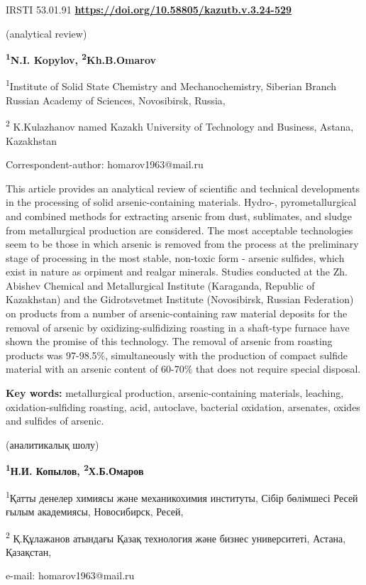 \newpage
IRSTI 53.01.91
\hfill {\bfseries \href{https://doi.org/10.58805/kazutb.v.3.24-529}{https://doi.org/10.58805/kazutb.v.3.24-529}}


\begin{center}
(analytical review)

{\bfseries \textsuperscript{1}N.I. Kopylov,
\textsuperscript{2}Kh.B.Omarov\envelope}

\textsuperscript{1}Institute of Solid State Chemistry and
Mechanochemistry, Siberian Branch Russian Academy of Sciences,
Novosibirsk, Russia,

\textsuperscript{2} K.Kulazhanov named Kazakh University of Technology
and Business, Astana, Kazakhstan
\end{center}

\envelope Correspondent-author: homarov1963@mail.ru

This article provides an analytical review of scientific and technical
developments in the processing of solid arsenic-containing materials.
Hydro-, pyrometallurgical and combined methods for extracting arsenic
from dust, sublimates, and sludge from metallurgical production are
considered. The most acceptable technologies seem to be those in which
arsenic is removed from the process at the preliminary stage of
processing in the most stable, non-toxic form - arsenic sulfides, which
exist in nature as orpiment and realgar minerals. Studies conducted at
the Zh. Abishev Chemical and Metallurgical Institute (Karaganda,
Republic of Kazakhstan) and the Gidrotsvetmet Institute (Novosibirsk,
Russian Federation) on products from a number of arsenic-containing raw
material deposits for the removal of arsenic by oxidizing-sulfidizing
roasting in a shaft-type furnace have shown the promise of this
technology. The removal of arsenic from roasting products was 97-98.5\%,
simultaneously with the production of compact sulfide material with an
arsenic content of 60-70\% that does not require special disposal.

{\bfseries Key words:} metallurgical production, arsenic-containing
materials, leaching, oxidation-sulfiding roasting, acid, autoclave,
bacterial oxidation, arsenates, oxides and sulfides of arsenic.


\begin{center}
(аналитикалық шолу)

{\bfseries \textsuperscript{1}Н.И. Копылов,
\textsuperscript{2}Х.Б.Омаров\envelope}

\textsuperscript{1}Қатты денелер химиясы және механикохимия институты,
Сібір бөлімшесі Ресей ғылым академиясы, Новосибирск, Ресей,

\textsuperscript{2} Қ.Құлажанов атындағы Қазақ технология және бизнес
университеті, Астана, Қазақстан,

e-mail: homarov1963@mail.ru
\end{center}

